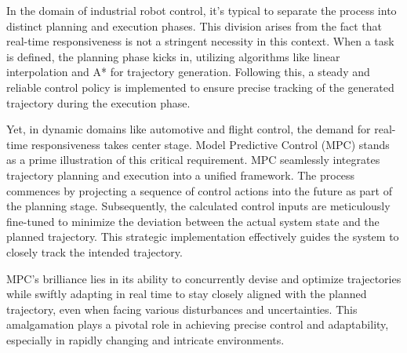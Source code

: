 In the domain of industrial robot control, it's typical to separate the process into distinct planning and execution phases. This division arises from the fact that real-time responsiveness is not a stringent necessity in this context. When a task is defined, the planning phase kicks in, utilizing algorithms like linear interpolation and A* for trajectory generation. Following this, a steady and reliable control policy is implemented to ensure precise tracking of the generated trajectory during the execution phase.

Yet, in dynamic domains like automotive and flight control, the demand for real-time responsiveness takes center stage. Model Predictive Control (MPC) stands as a prime illustration of this critical requirement. MPC seamlessly integrates trajectory planning and execution into a unified framework. The process commences by projecting a sequence of control actions into the future as part of the planning stage. Subsequently, the calculated control inputs are meticulously fine-tuned to minimize the deviation between the actual system state and the planned trajectory. This strategic implementation effectively guides the system to closely track the intended trajectory.

MPC's brilliance lies in its ability to concurrently devise and optimize trajectories while swiftly adapting in real time to stay closely aligned with the planned trajectory, even when facing various disturbances and uncertainties. This amalgamation plays a pivotal role in achieving precise control and adaptability, especially in rapidly changing and intricate environments.

